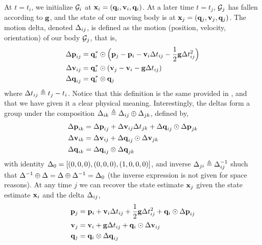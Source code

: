 At $t=t_i$, we initialize $\mathcal{G}_i$ at ${\bf x}_i=({\bf q}_i,{\bf v}_i,{\bf q}_i)$.
At a later time $t=t_j$,  $\mathcal{G}_j$ has fallen according to ${\bf g}$, and the state of our moving body is at ${\bf x}_j=({\bf q}_j,{\bf v}_j,{\bf q}_j)$.
The motion delta, denoted $\D_{ij}%
$, is defined as the motion (position, velocity, orientation) of our body \wrt  $\mathcal{G}_j$, that is,
%
\begin{align}\label{equ:delta_definition}
\begin{split}
{\Delta{\bf p}}_{ij} &= {\bf q}_i^*\odot\Big({\bf p}_j - {\bf p}_i - {\bf v}_i\Delta t_{ij} - \frac12{\bf g}\Delta t_{ij}^2\Big) \\
{\Delta{\bf v}}_{ij} &= {\bf q}_i^*\odot({\bf v}_j - {\bf v}_i - {\bf g}\Delta t_{ij}) \\
{\Delta{\bf q}}_{ij} &= {\bf q}_i^*\otimes{\bf q}_j 
\end{split}
\end{align}
%
where $\Delta t_{ij} \triangleq t_j - t_i$. 
Notice that this definition is the same provided in \cite{LUPTON-09,FORSTER-16-techrep}, and that we have given it a clear physical meaning.
Interestingly, the deltas form a group under the composition $\Delta_{ik}\triangleq\Delta_{ij}\oplus\Delta_{jk}$, defined by,
%
\begin{align} \label{equ:g_composition}
\begin{split}
{\Delta{\bf p}}_{ik} 
&= {\Delta{\bf p}}_{ij} + {\Delta{\bf v}}_{ij}\Delta t_{jk} + {\Delta{\bf q}}_{ij}\odot{\Delta{\bf p}}_{jk} \\
{\Delta{\bf v}}_{ik} 
&= {\Delta{\bf v}}_{ij} + {\Delta{\bf q}}_{ij}\odot{\Delta{\bf v}}_{jk} \\
{\Delta{\bf q}}_{ik} 
&= {\Delta{\bf q}}_{ij}\otimes{\Delta{\bf q}}_{jk} 
\end{split}
\end{align}
%
with identity $\Delta_0=[(0,0,0),(0,0,0),(1,0,0,0)]$, and inverse $\Delta_{ji}\triangleq\Delta_{ij}^{-1}$ shuch that $\Delta^{-1}\oplus\Delta=\Delta\oplus\Delta^{-1}=\Delta_0$ (the inverse expression is not given for space reasons).
At any time $j$ we can recover the state estimate ${\bf x}_j$ given the state estimate ${\bf x}_i$ and the delta $\Delta_{ij}$,
%
\begin{align} \label{equ:reconstruction}
\begin{split}
{\bf p}_j &= {\bf p}_i + {\bf v}_i\Delta t_{ij} + \frac12{\bf g}\Delta t_{ij}^2 + {\bf q}_i\odot{\Delta{\bf p}}_{ij} \\
{\bf v}_j &= {\bf v}_i + {\bf g}\Delta t_{ij} + {\bf q}_i\odot{\Delta{\bf v}}_{ij} \\
{\bf q}_j &= {\bf q}_i\otimes{\Delta{\bf q}}_{ij}   
\end{split}
\end{align}

